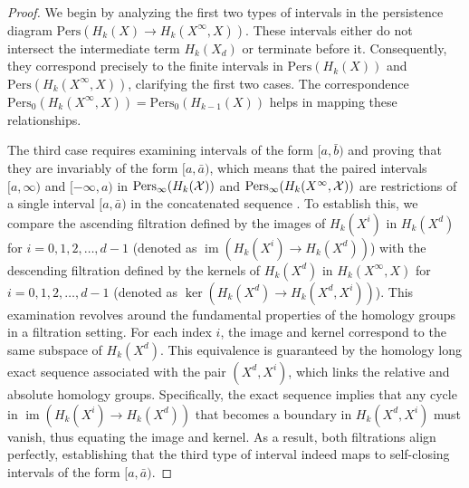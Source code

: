 \begin{proof}
	We begin by analyzing the first two types of intervals in the persistence diagram
	$\mathrm{Pers}(H_{k}(X) \to H_{k}(X^{\infty}, X))$. These intervals either do
	not intersect the intermediate term $H_{k}(X_{d})$ or terminate before it. Consequently,
	they correspond precisely to the finite intervals in $\mathrm{Pers}(H_{k}(X))$
	and $\mathrm{Pers}(H_{k}(X^{\infty}, X))$, clarifying the first two cases. The
	correspondence $\mathrm{Pers}_{0}(H_{k}(X^{\infty}, X)) = \mathrm{Pers}_{0}(H_{k-1}(X))$
	helps in mapping these relationships.

	The third case requires examining intervals of the form $[a, \bar{b})$ and
	proving that they are invariably of the form $[a, \bar{a})$, which means that
	the paired intervals $[a,\infty)$ and $[-\infty,a)$ in $\mathrm{Pers}_{\infty}(
	H_{k}({\mathcal{X}}))$ and $\mathrm{Pers}_{\infty}(H_{k}(X^{\infty}, {\mathcal{X}}))$ are restrictions
	of a single interval $[a,\bar{a})$ in the concatenated sequence \cite[Proof of Proposition 2.5]{de2011dualities}.
	To establish this, we compare the ascending filtration defined by the images of
	$H_{k}(X^{i})$ in $H_{k}(X^{d})$ for $i = 0, 1, 2, \ldots, d-1$ (denoted as
	$\operatorname{im}(H_{k}(X^{i}) \to H_{k}(X^{d}))$) with the descending filtration defined
	by the kernels of $H_{k}(X^{d})$ in $H_{k}(X^{\infty}, X)$ for $i = 0, 1, 2, \ldots
	, d-1$ (denoted as $\ker(H_{k}(X^{d}) \to H_{k}(X^{d}, X^{i}))$). This
	examination revolves around the fundamental properties of the homology groups
	in a filtration setting. For each index $i$, the image and kernel correspond to the same subspace of $H_{k}
	(X^{d})$. This equivalence is guaranteed by the homology long exact sequence
	associated with the pair $(X^{d}, X^{i})$, which links the relative and absolute
	homology groups. Specifically, the exact sequence implies that any cycle in $\operatorname{im}
	(H_{k}(X^{i}) \to H_{k}(X^{d}))$ that becomes a boundary in $H_{k}(X^{d}, X^{i}
	)$ must vanish, thus equating the image and kernel. As a result, both
	filtrations align perfectly, establishing that the third type of interval indeed
	maps to self-closing intervals of the form $[a, \bar{a})$.
\end{proof}

